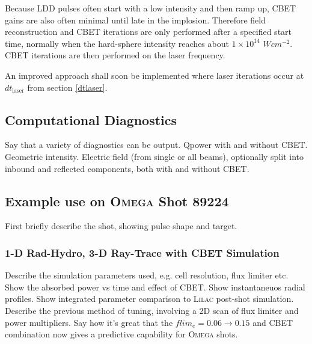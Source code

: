 Because LDD pulses often start with a low intensity and then ramp up, CBET gains are also often minimal until late in the implosion.
Therefore field reconstruction and CBET iterations are only performed after a specified start time, normally when the hard-sphere intensity reaches about $1\times 10^{14}$ $Wcm^{-2}$.
CBET iterations are then performed on the laser frequency.

An improved approach shall soon be implemented where laser iterations occur at $dt_{\text{laser}}$ from section \ref{dtlaser}.

\subsection{Computational Diagnostics}

Say that a variety of diagnostics can be output.
Qpower with and without CBET.
Geometric intensity.
Electric field (from single or all beams), optionally split into inbound and reflected components, both with and without CBET.

\subsection{Example use on \textsc{Omega} Shot 89224}

First briefly describe the shot, showing pulse shape and target.

\subsubsection{1-D Rad-Hydro, 3-D Ray-Trace with CBET Simulation}

Describe the simulation parameters used, e.g. cell resolution, flux limiter etc.
Show the absorbed power vs time and effect of CBET.
Show instantaneuos radial profiles.
Show integrated parameter comparison to \textsc{Lilac} post-shot simulation.
Describe the previous method of tuning, involving a 2D scan of flux limiter and power multipliers.
Say how it's great that the $flim_e = 0.06 \rightarrow 0.15$ and CBET combination now gives a predictive capability for \textsc{Omega} shots.


